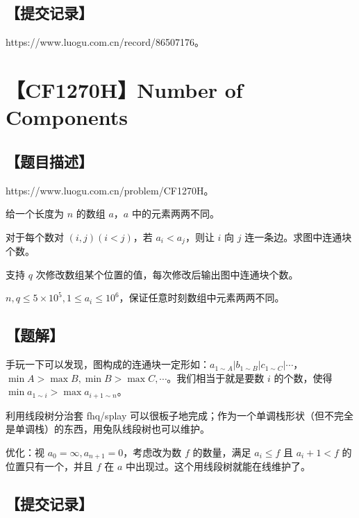 \documentclass[UTF8,12pt,a4paper]{ctexart}
\begin{document}
	\subsection*{【提交记录】}
	
	https://www.luogu.com.cn/record/86507176。
	
	
	\section*{【CF1270H】Number of Components}
	
	\subsection*{【题目描述】}
	
	https://www.luogu.com.cn/problem/CF1270H。
	
	给一个长度为 $n$ 的数组 $a$，$a$ 中的元素两两不同。
	
	对于每个数对 $(i,j)(i<j)$，若 $a_i<a_j$，则让 $i$ 向 $j$ 连一条边。求图中连通块个数。
	
	支持 $q$ 次修改数组某个位置的值，每次修改后输出图中连通块个数。
	
	$n,q\le 5\times 10^5,1\le a_i\le 10^6$，保证任意时刻数组中元素两两不同。
	
	\subsection*{【题解】}
	
	手玩一下可以发现，图构成的连通块一定形如：$a_{1\sim A} | b_{1\sim B} | c_{1\sim C} | \cdots$，$\min A>\max B, \min B>\max C, \cdots$。我们相当于就是要数 $i$ 的个数，使得 $\min a_{1\sim i}>\max a_{i+1\sim n}$。
	
	利用线段树分治套 fhq/splay 可以很板子地完成；作为一个单调栈形状（但不完全是单调栈）的东西，用兔队线段树也可以维护。
	
	优化：视 $a_0=\infty,a_{n+1}=0$，考虑改为数 $f$ 的数量，满足 $a_i\le f$ 且 $a_i+1<f$ 的位置只有一个，并且 $f$ 在 $a$ 中出现过。这个用线段树就能在线维护了。
	
	\subsection*{【提交记录】}
	
\end{document}
